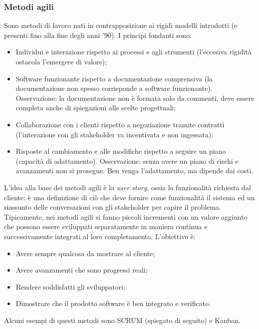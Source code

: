 \documentclass[../main]{subfiles}
\begin{document}
\subsubsection{Metodi agili}
Sono metodi di lavoro nati in contrapposizione ai rigidi modelli introdotti (e presenti fino alla fine degli anni '90).
I principi fondanti sono:
\begin{itemize}
    \item Individui e interazione rispetto ai processi e agli strumenti (l'eccesiva rigidità ostacola l'emergere di valore);
    \item Software funzionante rispetto a documentazione comprensiva (la documentazione non spesso corrisponde a software funzionante). Osservazione: la documentazione non è formata solo da commenti, deve essere completa anche di spiegazioni alle scelte progettuali;
    \item Collaborazione con i clienti rispetto a negoziazione tramite contratti (l'interazione con gli stakeholder va incentivata e non ingessata);
    \item Risposte al cambiamento e alle modifiche rispetto a seguire un piano (capacità di adattamento). Osservazione: senza avere un piano di rischi e avanzamenti non si prosegue. Ben venga l'adattamento, ma dipende dai costi.
\end{itemize}
L'idea alla base dei metodi agili è la \textit{user story}, ossia la funzionalità richiesta dal cliente: è una definizione di ciò che deve fornire come funzionalità il sistema ed un riassunto delle conversazioni con gli stakeholder per capire il problema.\newline
Tipicamente, nei metodi agili si fanno piccoli incrementi con un valore aggiunto che possono essere sviluppati separatamente in maniera continua e successivamente integrati al loro completamento.
L'obiettivo è:
\begin{itemize}
    \item Avere sempre qualcosa da mostrare al cliente;
    \item Avere avanzamenti che sono progressi reali;
    \item Rendere soddisfatti gli sviluppatori;
    \item Dimostrare che il prodotto software è ben integrato e verificato.
\end{itemize}
Alcuni esempi di questi metodi sono SCRUM (spiegato di seguito) e Kanban.
\end{document}

